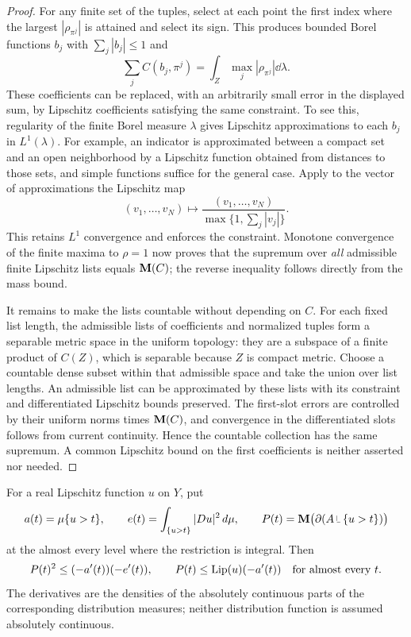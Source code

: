 \begin{proof}
For any finite set of the tuples, select at each point the first index
where the largest $|\rho_{\pi^j}|$ is attained and select its sign.
This produces bounded Borel functions $b_j$ with
$\sum_j|b_j|\le1$ and
\[
 \sum_j C(b_j,\pi^j)
   =\int_Z\max_j|\rho_{\pi^j}|\dd\lambda.
\]
These coefficients can be replaced, with an arbitrarily small error
in the displayed sum, by Lipschitz coefficients satisfying the same
constraint.  To see this, regularity of the finite Borel measure
$\lambda$ gives Lipschitz approximations to each $b_j$ in
$L^1(\lambda)$.  For example, an indicator is approximated between a
compact set and an open neighborhood by a Lipschitz function obtained
from distances to those sets, and simple functions suffice for the
general case.  Apply to the vector of approximations the Lipschitz map
\[
 (v_1,\ldots,v_N)\longmapsto
 \frac{(v_1,\ldots,v_N)}{\max\{1,\sum_j|v_j|\}}.
\]
This retains $L^1$ convergence and enforces the constraint.
Monotone convergence of the finite maxima to $\rho=1$ now proves that
the supremum over \emph{all} admissible finite Lipschitz lists equals
$\mathbf M(C)$; the reverse inequality follows directly from the mass bound.

It remains to make the lists countable without depending on $C$.
For each fixed list length, the admissible lists of coefficients and
normalized tuples form a separable metric space in the uniform
topology: they are a subspace of a finite product of $C(Z)$, which is
separable because $Z$ is compact metric.  Choose a countable dense
subset within that admissible space and take the union over list
lengths.  An admissible list can be approximated by these lists with
its constraint and differentiated Lipschitz bounds preserved.
The first-slot errors are controlled by their uniform norms times
$\mathbf M(C)$, and convergence in the differentiated slots follows from
current continuity.  Hence the countable collection has the same
supremum.  A common Lipschitz bound on the first coefficients is
neither asserted nor needed.
\end{proof}

\begin{lemma}
\label{lem:intrinsic-coarea}
For a real Lipschitz function $u$ on $Y$, put
\[
 a(t)=\mu\{u>t\},\qquad
 e(t)=\int_{\{u>t\}}|Du|^2\dd\mu,
 \qquad P(t)=\M\bigl(\partial(A\restr\{u>t\})\bigr)
\]
at the almost every level where the restriction is integral.  Then
\begin{equation}
 P(t)^2\le(-a'(t))(-e'(t)),\qquad
 P(t)\le\operatorname{Lip}(u)(-a'(t))
 \quad\text{for almost every }t.
 \label{eq:intrinsic-coarea}
\end{equation}
The derivatives are the densities of the absolutely continuous parts
of the corresponding distribution measures; neither distribution
function is assumed absolutely continuous.
\end{lemma}


